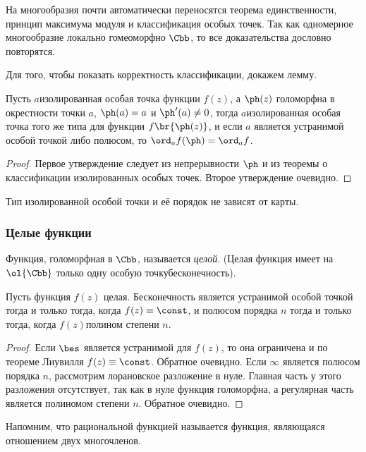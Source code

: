 \documentclass[a4paper]{article}
\begin{document}
На многообразия почти автоматически переносятся теорема единственности, принцип максимума модуля и
классификация особых точек. Так как одномерное многообразие локально гомеоморфно $\Cbb$, то все
доказательства дословно повторятся.

Для того, чтобы показать корректность классификации, докажем лемму.
\begin{lemma}
Пусть $a$\т изолированная особая точка функции $f(z)$, а $\ph(z)$ голоморфна в окрестности точки $a$,
$\ph(a)=a$ и $\ph'(a)\ne0$, тогда $a$\т изолированная особая точка того же типа для функции $f\br{\ph(z)}$, и  если
$a$ является устранимой особой точкой либо полюсом, то $\ord_a f(\ph)=\ord_a f$.
\end{lemma}
\begin{proof}
Первое утверждение следует из непрерывности $\ph$ и из теоремы о классификации изолированных особых точек.
Второе утверждение очевидно.
\end{proof}
\begin{imp}
Тип изолированной особой точки и её порядок не зависят от карты.
\end{imp}

\subsubsection{Целые функции}

\begin{df}
Функция, голоморфная в $\Cbb$, называется \emph{целой}. (Целая функция имеет на $\ol{\Cbb}$ только
одну особую точку\т бесконечность).
\end{df}

\begin{stm}
Пусть функция $f(z)$ целая. Бесконечность является устранимой особой точкой тогда и только тогда, когда
$f(z) \equiv \const$, и полюсом порядка $n$ тогда и только тогда, когда $f(z)$\т полином  степени $n$.
\end{stm}
\begin{proof}
Если $\bes$ является устранимой для $f(z)$, то она ограничена и по теореме Лиувилля $f(z)\equiv \const$.
Обратное очевидно.
Если $\infty$ является полюсом порядка $n$, рассмотрим лорановское разложение в нуле. Главная часть у
этого разложения отсутствует, так как в нуле функция голоморфна, а регулярная часть является полиномом степени $n$.
Обратное очевидно.
\end{proof}

Напомним, что рациональной функцией называется функция, являющаяся отношением двух многочленов.
\end{document}
